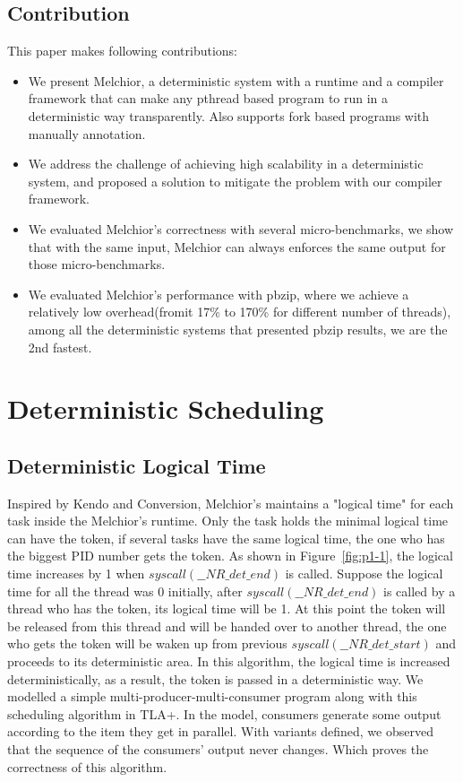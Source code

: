 \documentclass{sig-alternate}
\begin{document}
\subsection{Contribution}
This paper makes following contributions:

\begin{itemize}
  \item We present Melchior, a deterministic system with a runtime and a compiler framework that can make any pthread based program to run in a deterministic way transparently. Also supports fork based programs with manually annotation.
  \item We address the challenge of achieving high scalability in a deterministic system, and proposed a solution to mitigate the problem with our compiler framework.
  \item We evaluated Melchior's correctness with several micro-benchmarks, we show that with the same input, Melchior can always enforces the same output for those micro-benchmarks.
  \item We evaluated Melchior's performance with pbzip, where we achieve a relatively low overhead(fromit 17\% to 170\% for different number of threads), among all the deterministic systems that presented pbzip results, we are the 2nd fastest.
\end{itemize} 

\section{Deterministic Scheduling}
\subsection{Deterministic Logical Time}
Inspired by Kendo\cite{olszewski2009kendo} and Conversion\cite{merrifieldincreasing}, Melchior's maintains a "logical time" for each task inside the Melchior's runtime. Only the task holds the minimal logical time can have the token, if several tasks have the same logical time, the one who has the biggest PID number gets the token. As shown in Figure~\ref{fig:p1-1}, the logical time increases by 1 when $syscall(\_\_NR\_det\_end)$ is called. Suppose the logical time for all the thread was 0 initially, after $syscall(\_\_NR\_det\_end)$ is called by a thread who has the token, its logical time will be 1. At this point the token will be released from this thread and will be handed over to another thread, the one who gets the token will be waken up from previous $syscall(\_\_NR\_det\_start)$ and proceeds to its deterministic area. In this algorithm, the logical time is increased deterministically, as a result, the token is passed in a deterministic way. We modelled a simple multi-producer-multi-consumer program along with this scheduling algorithm in TLA+. In the model,  consumers generate some output according to the item they get in parallel. With variants defined, we observed that the sequence of the consumers' output never changes. Which proves the correctness of this algorithm.
\end{document}
